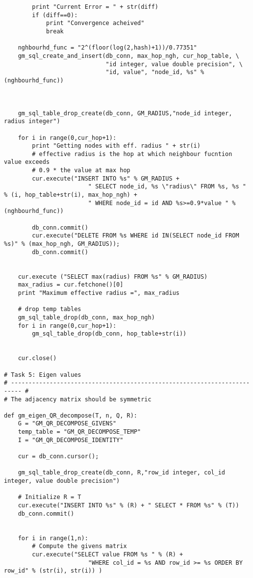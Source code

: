 \begin{lstlisting}
        print "Current Error = " + str(diff)
        if (diff==0):
            print "Convergence acheived"
            break

    nghbourhd_func = "2^(floor(log(2,hash)+1))/0.77351"
    gm_sql_create_and_insert(db_conn, max_hop_ngh, cur_hop_table, \
                             "id integer, value double precision", \
                             "id, value", "node_id, %s" % (nghbourhd_func))



    gm_sql_table_drop_create(db_conn, GM_RADIUS,"node_id integer, radius integer")

    for i in range(0,cur_hop+1):
        print "Getting nodes with eff. radius " + str(i)
        # effective radius is the hop at which neighbour fucntion value exceeds
        # 0.9 * the value at max hop
        cur.execute("INSERT INTO %s" % GM_RADIUS +
                        " SELECT node_id, %s \"radius\" FROM %s, %s " % (i, hop_table+str(i), max_hop_ngh) +
                        " WHERE node_id = id AND %s>=0.9*value " % (nghbourhd_func))

        db_conn.commit()
        cur.execute("DELETE FROM %s WHERE id IN(SELECT node_id FROM %s)" % (max_hop_ngh, GM_RADIUS));
        db_conn.commit()


    cur.execute ("SELECT max(radius) FROM %s" % GM_RADIUS)
    max_radius = cur.fetchone()[0]
    print "Maximum effective radius =", max_radius

    # drop temp tables
    gm_sql_table_drop(db_conn, max_hop_ngh)
    for i in range(0,cur_hop+1):
        gm_sql_table_drop(db_conn, hop_table+str(i))


    cur.close()

# Task 5: Eigen values
# ------------------------------------------------------------------------- #
# The adjacency matrix should be symmetric

def gm_eigen_QR_decompose(T, n, Q, R):
    G = "GM_QR_DECOMPOSE_GIVENS"
    temp_table = "GM_QR_DECOMPOSE_TEMP"
    I = "GM_QR_DECOMPOSE_IDENTITY"

    cur = db_conn.cursor();

    gm_sql_table_drop_create(db_conn, R,"row_id integer, col_id integer, value double precision")

    # Initialize R = T
    cur.execute("INSERT INTO %s" % (R) + " SELECT * FROM %s" % (T))
    db_conn.commit()


    for i in range(1,n):
        # Compute the givens matrix
        cur.execute("SELECT value FROM %s " % (R) +
                        "WHERE col_id = %s AND row_id >= %s ORDER BY row_id" % (str(i), str(i)) )


\end{lstlisting}
